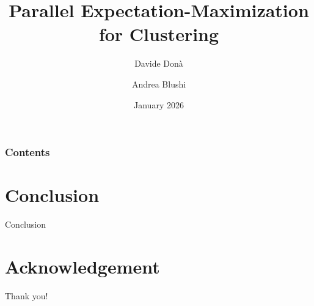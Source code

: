\documentclass[10pt]{beamer}
\begin{document}
\title[January 2026]{Parallel Expectation-Maximization for Clustering}
\author[University of Trento]{Davide Donà \and Andrea Blushi}


\date[]
{January 2026}

\frame{\titlepage}
\begin{frame}
\frametitle{Contents}
\tableofcontents
\end{frame}





\section{Conclusion}
    \begin{frame}{Conclusion}
    \end{frame}

\section*{Acknowledgement}  
\begin{frame}
\textcolor{myNewColorA}{\Huge{\centerline{Thank you!}}}
\end{frame}
\end{document}
